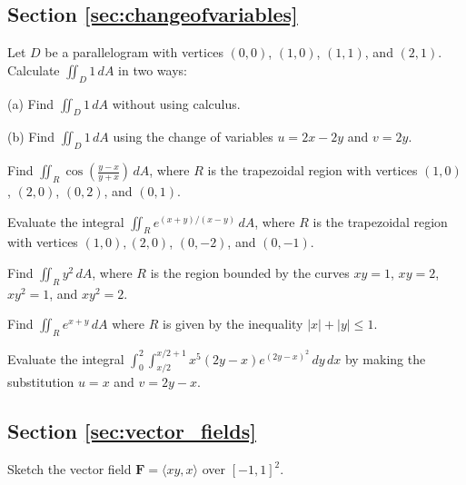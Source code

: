 \documentclass[svgnames]{watsonbook}
\begin{document}
\subsection*{Section \ref{sec:changeofvariables}}

\begin{exercise}{}{}
  Let $D$ be a parallelogram with vertices $(0,0)$, $(1,0)$, $(1,1)$,
  and $(2,1)$. Calculate $\iint_D 1\,dA$ in two ways:

  (a) Find $\iint_D 1\,dA$ without using calculus.

  (b) Find $\iint_D 1\,dA$ using the change of variables $u = 2x - 2y$
  and $v=2y$.
\end{exercise}

\begin{exercise}{}{}
Find
$\iint_R \cos \left(\frac{y-x}{y+x}\right) \, dA$, where $R$ is the
trapezoidal region with vertices $(1,0)$, $(2,0)$, $(0,2)$, and
$(0,1)$.
\end{exercise}

\begin{exercise}{}{}
  Evaluate the integral $\iint_R e^{(x+y)/(x-y)} \, dA$, where $R$ is
  the trapezoidal region with vertices $(1,0), (2,0)$, $(0,-2)$, and
  $(0,-1)$.
\end{exercise}

\begin{exercise}{}{}
  Find $\iint_R y^2 \, dA$, where $R$ is the region bounded by the
  curves $xy = 1$, $xy = 2$, $xy^2 = 1$, and $xy^2 = 2$.
\end{exercise}

\begin{exercise}{}{}
  Find $\iint_R e^{x+y} \, dA$ where $R$ is given by the inequality
  $|x| + |y| \leq 1$.
\end{exercise}

\begin{exercise}{}{}
  Evaluate the integral
  $\displaystyle{\int_{0}^{2}\!\int_{x/2}^{x/2+1} x^5 (2y -
    x)e^{(2y-x)^2} \,dy\,dx}$ by making the substitution $u = x$ and
  $v=2y-x$.
\end{exercise}

\subsection*{Section \ref{sec:vector_fields}}

\begin{exercise}{}{}
  Sketch the vector field $\mathbf{F} =\langle xy, x\rangle$ over
  $[-1,1]^2$. 
\end{exercise}
\end{document}
